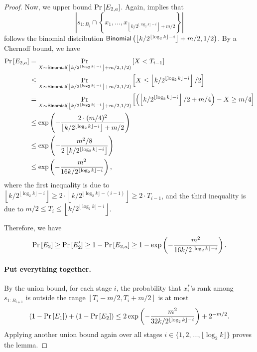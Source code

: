 \begin{proof}
Now, we upper bound $\Pr_{}\left[E_{2, a}\right]$. Again,  implies that
\[
    \left|s_{1:B_i} \cap \left\{x_1, \ldots, x_{\left\lfloor k/2^{\lfloor\log_2 k\rfloor - i}\right\rfloor + m/2}\right\}\right|
\]
follows the binomial distribution $\mathsf{Binomial}\left(\left\lfloor k/2^{\lfloor\log_2 k\rfloor - i}\right\rfloor + m/2, 1/2\right)$.  By a Chernoff bound, we have
\begin{align*}
  \Pr_{}\left[E_{2, a}\right]
&=  \Pr_{X \sim \mathsf{Binomial}(\left\lfloor k/2^{\lfloor\log_2 k\rfloor - i}\right\rfloor + m/2, 1/2)}\left[X < T_{i-1} \right]\\
&\le\Pr_{X \sim \mathsf{Binomial}(\left\lfloor k/2^{\lfloor\log_2 k\rfloor - i}\right\rfloor + m/2, 1/2)}\left[X  \le \left\lfloor k/2^{\lfloor\log_2 k\rfloor - i}\right\rfloor / 2\right]\\
&=  \Pr_{X \sim \mathsf{Binomial}(\left\lfloor k/2^{\lfloor\log_2 k\rfloor - i}\right\rfloor + m/2, 1/2)}\left[\left(\left\lfloor k/2^{\lfloor\log_2 k\rfloor - i}\right\rfloor / 2 + m / 4\right) - X \ge m / 4 \right]\\
&\le\exp\left(-\frac{2\cdot (m / 4)^2}{\left\lfloor k/2^{\lfloor\log_2 k\rfloor - i}\right\rfloor+ m / 2}\right)\\
&\le \exp\left(-\frac{m^2 / 8}{2 \left\lfloor k/2^{\lfloor\log_2 k\rfloor - i}\right\rfloor}\right) \notag \\
&\le \exp\left(-\frac{m^2}{16k/2^{\lfloor\log_2k\rfloor-i}}\right),
\end{align*}
where the first inequality is due to $  \left\lfloor k/2^{\lfloor\log_2 k\rfloor - i}\right\rfloor  \ge 2\cdot\left\lfloor k/2^{\lfloor\log_2 k\rfloor - (i-1)}\right\rfloor \ge 2\cdot T_{i-1}$, and the third inequality is due to $m/2 \le T_i \le \left\lfloor k/2^{\lfloor\log_2 k\rfloor - i}\right\rfloor$.

Therefore, we have
\[
    \Pr_{}\left[E_2\right]
\ge \Pr_{}\left[E'_2\right]
\ge 1 - \Pr_{}\left[E_{2,a}\right]
\ge 1 - \exp\left(-\frac{m^2}{16k/2^{\lfloor\log_2k\rfloor-i}}\right).
\]

\paragraph{Put everything together.} By the union bound, for each stage $i$, the probability that  $x_i^*$'s rank among $s_{1:B_{i+1}}$ is outside the range $[T_i - m/2, T_i + m/2]$ is at most
\[
    (1 - \Pr_{}\left[E_1\right]) + (1 - \Pr_{}\left[E_2\right])
\le 2\exp\left(-\frac{m^2}{32k/2^{\lfloor\log_2k\rfloor-i}}\right) + 2^{-m/2}.
\]
Applying another union bound again over all stages $i \in \{1, 2, \ldots, \lfloor\log_2k\rfloor\}$ proves the lemma.
\end{proof}

